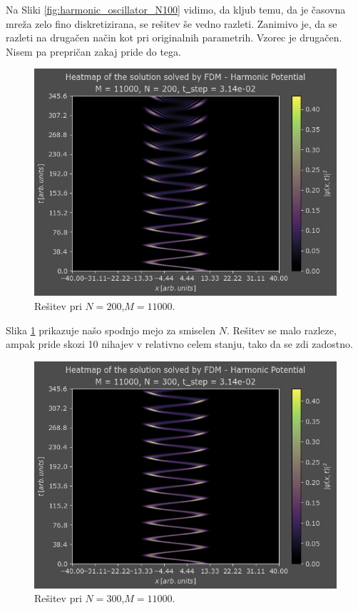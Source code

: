 \documentclass[a4paper]{article}
\begin{document}
Na Sliki \ref{fig:harmonic_oscillator_N100} vidimo, da kljub temu, da je časovna mreža zelo fino diskretizirana,
 se rešitev še vedno razleti.
Zanimivo je, da se razleti na drugačen način kot pri originalnih parametrih. Vzorec je drugačen. Nisem 
pa prepričan zakaj pride do tega. 

\begin{figure}[p]
    \centering
    \includegraphics[width=\textwidth]{./images/case1_N200.png}
    \caption{Rešitev pri $N=200$,$M=11000$.}
    \label{fig:harmonic_oscillator_N200}
\end{figure}

Slika \ref{fig:harmonic_oscillator_N200} prikazuje našo spodnjo mejo za smiselen $N$. 
Rešitev se malo razleze, ampak pride skozi 10 nihajev v relativno celem stanju, tako da se zdi zadostno.

\begin{figure}[p]
    \centering
    \includegraphics[width=\textwidth]{./images/case1_N300.png}
    \caption{Rešitev pri $N=300$,$M=11000$.}
    \label{fig:harmonic_oscillator_N300}
\end{figure}
\end{document}
